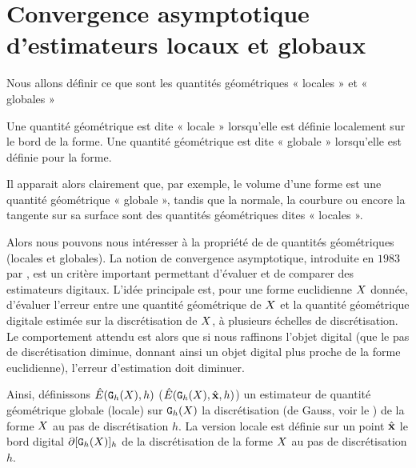 \section{Convergence asymptotique d'estimateurs locaux et globaux}
\label{sec:multigrid-convergence-estimator}
%
Nous allons définir ce que sont les quantités géométriques « locales » et « globales »
%
\begin{definition}{}
  \label{def:global-quantity}
  Une quantité géométrique est dite « locale » lorsqu'elle est définie
  localement sur le bord de la forme. Une quantité géométrique est dite «
  globale » lorsqu'elle est définie pour la forme.
\end{definition}
%
Il apparait alors clairement que, par exemple, le volume d'une forme est une
quantité géométrique « globale », tandis que la normale, la courbure ou encore
la tangente sur sa surface sont des quantités géométriques dites « locales ».


Alors nous pouvons nous intéresser à la propriété de  de quantités géométriques (locales et globales). La
notion de convergence asymptotique, introduite en $1983$ par
, est un critère important permettant d'évaluer et de
comparer des estimateurs digitaux. L'idée principale est, pour une forme
euclidienne $X$ donnée, d'évaluer l'erreur entre une quantité géométrique
de $X$ et la quantité géométrique digitale estimée sur la discrétisation de
$X$, à plusieurs échelles de discrétisation. Le comportement attendu est
alors que si nous raffinons l'objet digital (\cad que le pas de discrétisation
diminue, donnant ainsi un objet digital plus proche de la forme euclidienne),
l'erreur d'estimation doit diminuer.


Ainsi, définissons $\hat{E}(\mathtt{G}_{h}(X),h)$ (\respp $\hat{E}(\mathtt{G}_{h}(X),\hat{\mathbf{x}},h)$) un
estimateur de quantité géométrique globale (\resp locale) sur $\mathtt{G}_{h}(X)$ la
discrétisation (de Gauss, voir le ) de la forme
$X$ au pas de discrétisation $h$. La version locale est définie sur un
point $\hat{\mathbf{x}}$ le bord digital $\partial\lbrack \mathtt{G}_{h}(X) \rbrack_{h}$ de la discrétisation
de la forme $X$ au pas de discrétisation $h$.


